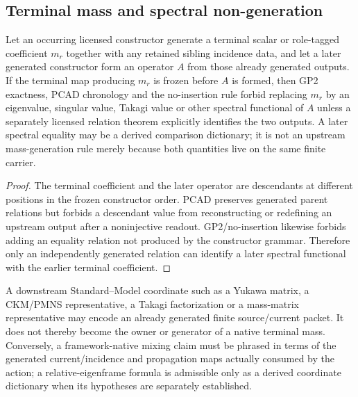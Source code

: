 \documentclass[12pt,a4paper]{article}
\begin{document}
\subsection{Terminal mass and spectral non-generation}
\label{p2a:sec:v3105-mass-ontology-chronology}

\begin{theorem}
\label{p2a:thm:v3105-no-spectral-backgeneration}
Let an occurring licensed constructor generate a terminal scalar or role-tagged
coefficient $m_r$ together with any retained sibling incidence data, and let a
later generated constructor form an operator $A$ from those already generated
outputs.  If the terminal map producing $m_r$ is frozen before $A$ is formed,
then GP2 exactness, PCAD chronology and the no-insertion rule forbid replacing
$m_r$ by an eigenvalue, singular value, Takagi value or other spectral
functional of $A$ unless a separately licensed relation theorem explicitly
identifies the two outputs.  A later spectral equality may be a derived
comparison dictionary; it is not an upstream mass-generation rule merely
because both quantities live on the same finite carrier.
\end{theorem}
\begin{proof}
The terminal coefficient and the later operator are descendants at different
positions in the frozen constructor order.  PCAD preserves generated parent
relations but forbids a descendant value from reconstructing or redefining an
upstream output after a noninjective readout.  GP2/no-insertion likewise
forbids adding an equality relation not produced by the constructor grammar.
Therefore only an independently generated relation can identify a later
spectral functional with the earlier terminal coefficient.
\end{proof}

\begin{corollary}
\label{p2a:cor:v3105-sm-dictionary-firewall}
A downstream Standard--Model coordinate such as a Yukawa matrix, a
CKM/PMNS representative, a Takagi factorization or a mass-matrix
representative may encode an already generated finite source/current packet.
It does not thereby become the owner or generator of a native terminal mass.
Conversely, a framework-native mixing claim must be phrased in terms of the
generated current/incidence and propagation maps actually consumed by the
action; a relative-eigenframe formula is admissible only as a derived
coordinate dictionary when its hypotheses are separately established.
\end{corollary}
\end{document}
